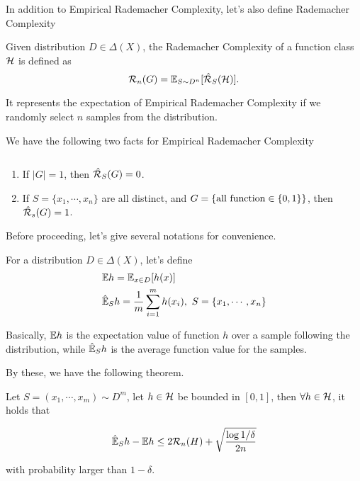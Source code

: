 \documentclass[../main.tex]{subfiles}
\begin{document}
	In addition to Empirical Rademacher Complexity, let's also define Rademacher Complexity
	
	\begin{definition}
		Given distribution $D\in \Delta(X)$, the Rademacher Complexity of a function class $\mathcal{H}$ is defined as
			\begin{equation}
				\mathcal{R}_n(G) = \mathbb{E}_{S \sim D^n} [\hat{\mathcal{R}}_S(\mathcal{H}) ].
			\end{equation}
	\end{definition}

	It represents the expectation of Empirical Rademacher Complexity if we randomly select $n$ samples from the distribution.
	
	We have the following two facts for Empirical Rademacher Complexity
	
	\begin{fact} $ $
		
		\begin{enumerate}
			\item If $|G| = 1$, then $\hat{\mathcal{R}}_S(G) = 0$.
			\item If $S = \{x_1,\cdots, x_n\}$ are all distinct, and $G = \{\textmd{all function}\in \{0,1\}\}$, then $\hat{\mathcal{R}}_s(G) = 1$.
		\end{enumerate}
	\end{fact} 

	Before proceeding, let's give several notations for convenience.
	
	\begin{notation}
		For a distribution $D \in \Delta(X)$, let's define
		\begin{equation}
			\begin{aligned}
				& \mathbb{E} h = \mathbb{E}_{x\in D}[h(x)] \\
				&\hat{\mathbb{E}}_S h = \frac{1}{m} \sum\limits_{i=1}^m h(x_i), \ S =\{x_1, \cdots, x_n\}
			\end{aligned}
		\end{equation}
	\end{notation}

	Basically, $\mathbb{E} h$ is the expectation value of function $h$ over a sample following the distribution, while $\hat{\mathbb{E}}_S h$ is the average function value for the samples.
	
	By these, we have the following theorem.
	
	\begin{theorem}\label{symmetric_lemma}
		
		Let $S = (x_1,\cdots, x_m) \sim D^m$, let $h \in \mathcal{H}$ be bounded in $[0,1]$, then $\forall h\in \mathcal{H}$, it holds that 
		
		\begin{equation}
			\hat{\mathbb{E}}_S h - \mathbb{E} h  \leq 2 \mathcal{R}_n(H) + \sqrt{\frac{\log 1 / \delta}{2n}}
		\end{equation}
		
		with probability larger than $1-\delta$.
	\end{theorem}
\end{document}
